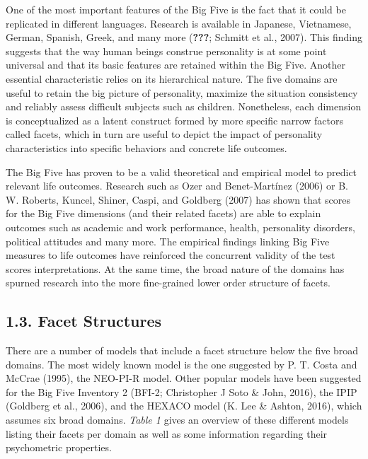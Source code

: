 \documentclass[,man,floatsintext]{apa6}
\begin{document}
One of the most important features of the Big Five is the fact that it
could be replicated in different languages. Research is available in
Japanese, Vietnamese, German, Spanish, Greek, and many more
({\textbf{???}}; Schmitt et al., 2007). This finding suggests that the
way human beings construe personality is at some point universal and
that its basic features are retained within the Big Five. Another
essential characteristic relies on its hierarchical nature. The five
domains are useful to retain the big picture of personality, maximize
the situation consistency and reliably assess difficult subjects such as
children. Nonetheless, each dimension is conceptualized as a latent
construct formed by more specific narrow factors called facets, which in
turn are useful to depict the impact of personality characteristics into
specific behaviors and concrete life outcomes.

The Big Five has proven to be a valid theoretical and empirical model to
predict relevant life outcomes. Research such as Ozer and Benet-Martínez
(2006) or B. W. Roberts, Kuncel, Shiner, Caspi, and Goldberg (2007) has
shown that scores for the Big Five dimensions (and their related facets)
are able to explain outcomes such as academic and work performance,
health, personality disorders, political attitudes and many more. The
empirical findings linking Big Five measures to life outcomes have
reinforced the concurrent validity of the test scores interpretations.
At the same time, the broad nature of the domains has spurned research
into the more fine-grained lower order structure of facets.

\subsection{1.3. Facet Structures}\label{facet-structures}

There are a number of models that include a facet structure below the
five broad domains. The most widely known model is the one suggested by
P. T. Costa and McCrae (1995), the NEO-PI-R model. Other popular models
have been suggested for the Big Five Inventory 2 (BFI-2; Christopher J
Soto \& John, 2016), the IPIP (Goldberg et al., 2006), and the HEXACO
model (K. Lee \& Ashton, 2016), which assumes six broad domains.
\emph{Table 1} gives an overview of these different models listing their
facets per domain as well as some information regarding their
psychometric properties.

\vspace{5mm}
\end{document}
